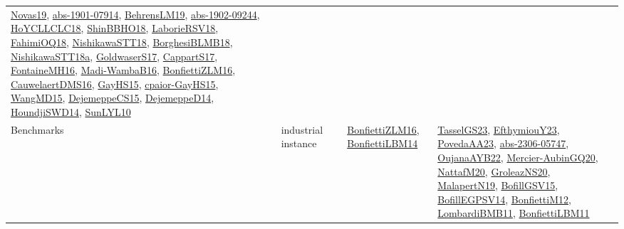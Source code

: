 {\begin{longtable}{lp{3cm}>{\raggedright}p{6cm}>{\raggedright}p{6cm}p{8cm}}
\href{articles/Novas19.pdf}{Novas19}\cite{Novas19}, \href{articles/abs-1901-07914.pdf}{abs-1901-07914}\cite{abs-1901-07914}, \href{papers/BehrensLM19.pdf}{BehrensLM19}\cite{BehrensLM19}, \href{articles/abs-1902-09244.pdf}{abs-1902-09244}\cite{abs-1902-09244}, \href{papers/HoYCLLCLC18.pdf}{HoYCLLCLC18}\cite{HoYCLLCLC18}, \href{articles/ShinBBHO18.pdf}{ShinBBHO18}\cite{ShinBBHO18}, \href{articles/LaborieRSV18.pdf}{LaborieRSV18}\cite{LaborieRSV18}, \href{articles/FahimiOQ18.pdf}{FahimiOQ18}\cite{FahimiOQ18}, \href{papers/NishikawaSTT18.pdf}{NishikawaSTT18}\cite{NishikawaSTT18}, \href{articles/BorghesiBLMB18.pdf}{BorghesiBLMB18}\cite{BorghesiBLMB18}, \href{papers/NishikawaSTT18a.pdf}{NishikawaSTT18a}\cite{NishikawaSTT18a}, \href{papers/GoldwaserS17.pdf}{GoldwaserS17}\cite{GoldwaserS17}, \href{papers/CappartS17.pdf}{CappartS17}\cite{CappartS17}, \href{papers/FontaineMH16.pdf}{FontaineMH16}\cite{FontaineMH16}, \href{papers/Madi-WambaB16.pdf}{Madi-WambaB16}\cite{Madi-WambaB16}, \href{papers/BonfiettiZLM16.pdf}{BonfiettiZLM16}\cite{BonfiettiZLM16}, \href{papers/CauwelaertDMS16.pdf}{CauwelaertDMS16}\cite{CauwelaertDMS16}, \href{papers/GayHS15.pdf}{GayHS15}\cite{GayHS15}, \href{papers/cpaior-GayHS15.pdf}{cpaior-GayHS15}\cite{cpaior-GayHS15}, \href{articles/WangMD15.pdf}{WangMD15}\cite{WangMD15}, \href{papers/DejemeppeCS15.pdf}{DejemeppeCS15}\cite{DejemeppeCS15}, \href{papers/DejemeppeD14.pdf}{DejemeppeD14}\cite{DejemeppeD14}, \href{papers/HoundjiSWD14.pdf}{HoundjiSWD14}\cite{HoundjiSWD14}, \href{papers/SunLYL10.pdf}{SunLYL10}\cite{SunLYL10}\\
Benchmarks & industrial instance &  & \href{papers/BonfiettiZLM16.pdf}{BonfiettiZLM16}\cite{BonfiettiZLM16}, \href{articles/BonfiettiLBM14.pdf}{BonfiettiLBM14}\cite{BonfiettiLBM14} & \href{papers/TasselGS23.pdf}{TasselGS23}\cite{TasselGS23}, \href{papers/EfthymiouY23.pdf}{EfthymiouY23}\cite{EfthymiouY23}, \href{papers/PovedaAA23.pdf}{PovedaAA23}\cite{PovedaAA23}, \href{articles/abs-2306-05747.pdf}{abs-2306-05747}\cite{abs-2306-05747}, \href{papers/OujanaAYB22.pdf}{OujanaAYB22}\cite{OujanaAYB22}, \href{papers/Mercier-AubinGQ20.pdf}{Mercier-AubinGQ20}\cite{Mercier-AubinGQ20}, \href{papers/NattafM20.pdf}{NattafM20}\cite{NattafM20}, \href{papers/GroleazNS20.pdf}{GroleazNS20}\cite{GroleazNS20}, \href{papers/MalapertN19.pdf}{MalapertN19}\cite{MalapertN19}, \href{papers/BofillGSV15.pdf}{BofillGSV15}\cite{BofillGSV15}, \href{papers/BofillEGPSV14.pdf}{BofillEGPSV14}\cite{BofillEGPSV14}, \href{papers/BonfiettiM12.pdf}{BonfiettiM12}\cite{BonfiettiM12}, \href{papers/LombardiBMB11.pdf}{LombardiBMB11}\cite{LombardiBMB11}, \href{papers/BonfiettiLBM11.pdf}{BonfiettiLBM11}\cite{BonfiettiLBM11}\\

\end{longtable}}
